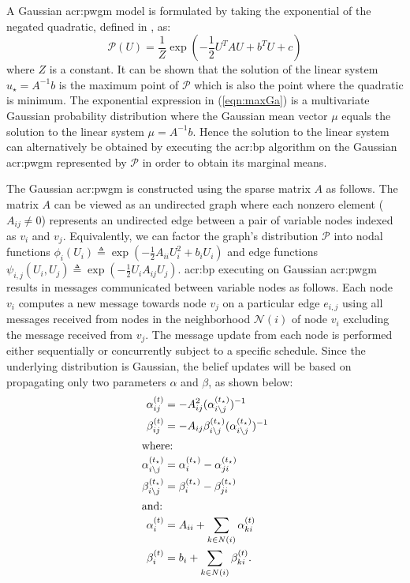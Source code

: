A Gaussian \gls{acr:pwgm} model is formulated by taking the exponential of the negated quadratic, defined in , as:
\begin{equation} 
	\label{eqn:maxGa}
	\mathcal{P}(U) = \frac{1}{Z}\exp(- \frac{1}{2}U^T A U + b^T U + c) 
\end{equation}
where $Z$ is a constant.
It can be shown that the solution of the linear system $u_{\star}=A^{-1}b$ is the maximum point of $\mathcal{P}$ which is also the point where the quadratic  is minimum.
The exponential expression in (\ref{eqn:maxGa}) is a multivariate Gaussian probability distribution where the Gaussian mean vector $\mu$ equals the solution to the linear system $\mu = A^{-1} b$.
Hence the solution to the linear system can alternatively be obtained by executing the \gls{acr:bp} algorithm on the Gaussian \gls{acr:pwgm} represented by $\mathcal{P}$ in order to obtain its marginal means.

The Gaussian \gls{acr:pwgm} is constructed using the sparse matrix $A$ as follows.
The matrix $A$ can be viewed as an undirected graph where each nonzero element ($A_{ij} \neq 0$) represents an undirected edge between a pair of variable nodes indexed as $v_i$ and $v_j$.
Equivalently, we can factor the graph's distribution $\mathcal{P}$ into nodal functions $ \phi_i(U_i) \triangleq  \exp(- \frac{1}{2} A_{ii}U_i^2 + b_iU_i)$ and edge functions $\psi_{i,j}(U_i,U_j) \triangleq \exp(- \frac{1}{2} U_i A_{ij} U_j) $.
\gls{acr:bp} executing on Gaussian \gls{acr:pwgm} results in messages communicated between variable nodes as follows.
Each node $v_i$ computes a new message towards node $v_j$ on a particular edge $e_{i,j}$  using all messages received from nodes in the neighborhood $\mathcal{N}(i)$ of node $v_i$ excluding the message received from $v_j$.
The message update from each node is performed either sequentially or concurrently subject to a specific schedule.
Since the underlying distribution is Gaussian, the belief updates will be based on propagating only two parameters $\alpha$ and $\beta$, as shown below:
\begin{align}
\label{eqn_GaBPUpdateP}
\alpha_{ij}^{(t)} & = -A_{ij}^2 (\alpha_{i \setminus j}^{(t_\star)})^{-1} \\
\label{eqn_GaBPUpdateM}
\beta_{ij}^{(t)} & = -A_{ij} \beta_{i \setminus j}^{(t_\star)} (\alpha_{i \setminus j}^{(t_\star)})^{-1} \\
\intertext{where:}
\label{eqn_a_i_minus_j_bc}
\alpha_{i \setminus j}^{(t_\star)} & =  \alpha_i^{(t_\star)} - \alpha_{ji}^{(t_\star)} \\
\label{eqn_b_i_minus_j_bc}
\beta_{i \setminus j}^{(t_\star)} & = \beta_i^{(t_\star)} - \beta_{ji}^{(t_\star)} \\
\intertext{and:}
\alpha_i^{(t)} & = A_{ii} + \sum_{k \in N(i)} \alpha_{ki}^{(t)} \\
\beta_i^{(t)} & = b_i + \sum_{k \in N(i)} \beta_{ki}^{(t)} .
\end{align}


